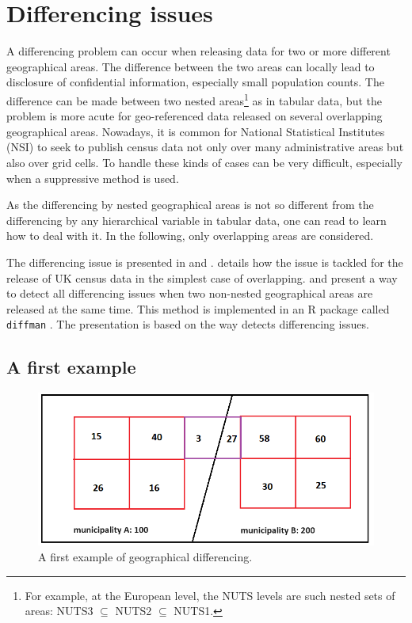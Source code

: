 \section{Differencing issues} \label{sec:risk_diff}

A differencing problem can occur when releasing data for two or more different geographical areas. The difference between the two areas can locally lead to disclosure of confidential information, especially small population counts. The difference can be made between two nested areas\footnote{
    For example, at the European level, the NUTS levels are such nested sets of areas: NUTS3 $\subseteq$ NUTS2 $\subseteq$ NUTS1.} 
as in tabular data, but the problem is more acute for geo-referenced data released on several overlapping geographical areas. Nowadays, it is common for National Statistical Institutes (NSI) to seek to publish census data not only over many administrative areas but also over grid cells. To handle these kinds of cases can be very difficult, especially when a suppressive method is used.

As the differencing by nested geographical areas is not so different from the differencing by any hierarchical variable in tabular data, one can read \citet[4.3.1]{HundepoolEtAl2024} to learn how to deal with it. In the following, only overlapping areas are considered.

The differencing issue is presented in \citet[5.2]{HundepoolEtAl2024} and \cite{BuronFontaine2018}. \cite{Duke-Williams_Rees_1998} details how the issue is tackled for the release of UK census data in the simplest case of overlapping. \cite{Costemalle_2018}  and \cite{Costemalle_2019} present a way to detect all differencing issues when two non-nested geographical areas are released at the same time. This method is implemented in an R package called \texttt{diffman} \citep{diffman}. The presentation is based on the way \cite{Costemalle_2019} detects differencing issues.

\subsection{A first example}

\begin{figure}[H]
\centering
\includegraphics[width=\linewidth]{figures/Differencing_issues/protection_process_0_en.png}
\caption{A first example of geographical differencing.}
\label{fig:cas_complex_12}
\end{figure}

